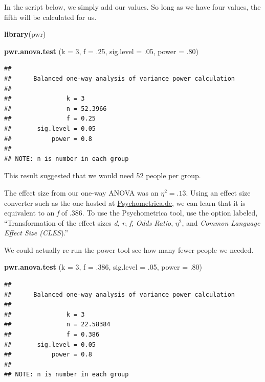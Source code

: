 \documentclass[
  english,
]{book}
\newenvironment{Shaded}{\begin{snugshade}}{\end{snugshade}}
\newcommand{\DataTypeTok}[1]{\textcolor[rgb]{0.13,0.29,0.53}{#1}}
\newcommand{\DecValTok}[1]{\textcolor[rgb]{0.00,0.00,0.81}{#1}}
\newcommand{\FloatTok}[1]{\textcolor[rgb]{0.00,0.00,0.81}{#1}}
\newcommand{\KeywordTok}[1]{\textcolor[rgb]{0.13,0.29,0.53}{\textbf{#1}}}
\newcommand{\NormalTok}[1]{#1}
\begin{document}
In the script below, we simply add our values. So long as we have four values, the fifth will be calculated for us.

\begin{Shaded}
\begin{Highlighting}[]
\KeywordTok{library}\NormalTok{(pwr)}

\KeywordTok{pwr.anova.test}\NormalTok{ (}\DataTypeTok{k =} \DecValTok{3}\NormalTok{, }\DataTypeTok{f =} \FloatTok{.25}\NormalTok{, }\DataTypeTok{sig.level =} \FloatTok{.05}\NormalTok{, }\DataTypeTok{power =} \FloatTok{.80}\NormalTok{)}
\end{Highlighting}
\end{Shaded}

\begin{verbatim}
## 
##      Balanced one-way analysis of variance power calculation 
## 
##               k = 3
##               n = 52.3966
##               f = 0.25
##       sig.level = 0.05
##           power = 0.8
## 
## NOTE: n is number in each group
\end{verbatim}

This result suggested that we would need 52 people per group.

The effect size from our one-way ANOVA was an \(\eta^2 = .13\). Using an effect size converter such as the one hosted at \href{https://www.psychometrica.de/effect_size.html}{Psychometrica.de}, we can learn that it is equivalent to an \emph{f} of .386. To use the Psychometrica tool, use the option labeled, ``Transformation of the effect sizes \emph{d}, \emph{r}, \emph{f}, \emph{Odds Ratio}, \(\eta^2\), and \emph{Common Language Effect Size (CLES}).''

We could actually re-run the power tool see how many fewer people we needed.

\begin{Shaded}
\begin{Highlighting}[]
\KeywordTok{pwr.anova.test}\NormalTok{ (}\DataTypeTok{k =} \DecValTok{3}\NormalTok{, }\DataTypeTok{f =} \FloatTok{.386}\NormalTok{, }\DataTypeTok{sig.level =} \FloatTok{.05}\NormalTok{, }\DataTypeTok{power =} \FloatTok{.80}\NormalTok{)}
\end{Highlighting}
\end{Shaded}

\begin{verbatim}
## 
##      Balanced one-way analysis of variance power calculation 
## 
##               k = 3
##               n = 22.58384
##               f = 0.386
##       sig.level = 0.05
##           power = 0.8
## 
## NOTE: n is number in each group
\end{verbatim}
\end{document}
